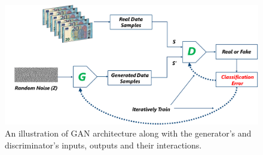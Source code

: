 

\vspace*{0.4cm}
\begin{figure}[H]
        \begin{center}
	    \includegraphics[scale=0.30]{images/Fundamentals/GANStructure.png}
	    \caption[An illustration of \ac{GAN} architecture.]{An illustration of \ac{GAN} architecture along with the generator's and discriminator's inputs, outputs and their interactions.}
	    \label{fig:GANStructure}
	    \end{center}
\end{figure}



